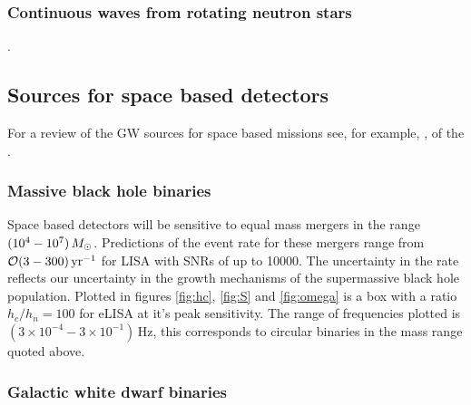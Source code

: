 \subsubsection{Continuous waves from rotating neutron stars}

{}.


\subsection{Sources for space based detectors}
For a review of the GW sources for space based missions see, for example, \cite{Amaro-Seoane-et-al}, \cite{Gairetal} of the \cite{eLISAyellowbook}.


\subsubsection{Massive black hole binaries}
Space based detectors will be sensitive to equal mass mergers in the range $(10^{4}-10^{7})\,M_{ \odot }$. Predictions of the event rate for these mergers range from ${\cal{O}}(3-300)\,\textrm{yr}^{-1}$ for LISA with SNRs of up to 10000. The uncertainty in the rate reflects our uncertainty in the growth mechanisms of the supermassive black hole population. Plotted in figures \ref{fig:hc}, \ref{fig:S} and \ref{fig:omega} is a box with a ratio $h_{c}/h_{n}=100$ for eLISA at it's peak sensitivity. The range of frequencies plotted is $(3\times 10^{-4}-3\times 10^{-1})\,\textrm{Hz}$, this corresponds to circular binaries in the mass range quoted above.

\subsubsection{Galactic white dwarf binaries} \label{sec:GB}


